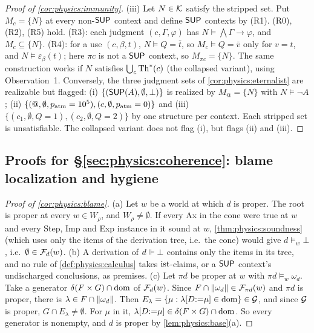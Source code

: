 \begin{proof}[Proof of \cref{cor:physics:immunity}]
(iii) Let $N\in\mathcal{K}$ satisfy the stripped set. Put $M_c=\{N\}$ at every non-$\mathsf{SUP}$ context
and define $\mathsf{SUP}$ contexts by (R1). (R0), (R2), (R5) hold. (R3): each judgment
$(c,\Gamma,\varphi)$ has $N\models\bigwedge\Gamma\to\varphi$, and $M_c\subseteq\{N\}$. (R4): for
a use $(c,\beta,t)$, $N\models Q=\bar t$, so $M_c\models Q=\bar v$ only for $v=t$, and
$N\models\varepsilon_\beta(t)$; here $\pi c$ is not a $\mathsf{SUP}$ context, so $M_{\pi c}=\{N\}$. The
same construction works if $N$ satisfies $\bigcup_c\mathrm{Th}^*(c)$ (the collapsed variant), using
Observation~1. Conversely, the three judgment sets of \cref{cor:physics:eternalist} are
realizable but flagged: (i) $\{(\mathsf{SUP}(A),\emptyset,\bot)\}$ is realized by $M_@=\{N\}$ with
$N\models\neg A$; (ii) $\{(@,\emptyset,p_{\rm atm}=10^5),(c,\emptyset,p_{\rm atm}=0)\}$ and
(iii) $\{(c_1,\emptyset,Q=1),(c_2,\emptyset,Q=2)\}$ by one structure per context. Each
stripped set is unsatisfiable. The collapsed variant does not flag (i), but flags (ii) and
(iii).
\end{proof}

\subsection{Proofs for \S\ref{sec:physics:coherence}: blame localization and hygiene}

\begin{proof}[Proof of \cref{cor:physics:blame}]
(a) Let $w$ be a world at which $d$ is proper. The root is proper at every $w\in W_\rho$,
and $W_\rho\neq\emptyset$. If every Ax in the cone were true at $w$ and every Step, Imp and
Exp instance in it sound at $w$, \cref{thm:physics:soundness} (which uses only the items
of the derivation tree, i.e.\ the cone) would give $d\models_w\bot$, i.e.\
$\emptyset\in\mathcal{F}_d(w)$. (b) A derivation of $d\Vdash\bot$ contains only the items in its tree,
and no rule of \cref{def:physics:calculus} takes $\mathrm{ist}$-claims, or a $\mathsf{SUP}$ context's
undischarged conclusions, as premises. (c) Let $\pi d$ be proper at $w$ with
$\pi d\models_w\omega_d$. Take a generator $\delta(F\times G)\cap\operatorname{dom}$ of $\mathcal{F}_d(w)$. Since
$F\cap\lVert \omega_d\rVert\in\mathcal{F}_{\pi d}(w)$ and $\pi d$ is proper, there is
$\lambda\in F\cap\lVert \omega_d\rVert$. Then $E_\lambda=\{\mu:\lambda[D{:=}\mu]\in\operatorname{dom}\}\in\mathcal{G}$,
and since $\mathcal{G}$ is proper, $G\cap E_\lambda\neq\emptyset$. For $\mu$ in it,
$\lambda[D{:=}\mu]\in\delta(F\times G)\cap\operatorname{dom}$. So every generator is nonempty, and
$d$ is proper by \cref{lem:physics:base}(a).
\end{proof}

